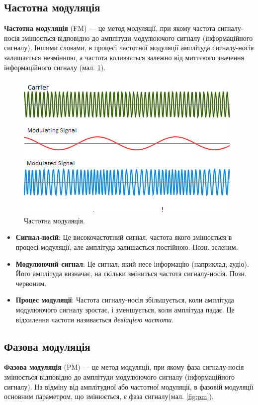 \documentclass{article}
\begin{document}
\subsection{Частотна модуляція}

\textbf{Частотна модуляція} (FM) --- це метод модуляції, при якому частота сигналу-носія змінюється відповідно до амплітуди модулюючого сигналу (інформаційного сигналу). Іншими словами, в процесі частотної модуляції амплітуда сигналу-носія залишається незмінною, а частота коливається залежно від миттєвого значення інформаційного сигналу (мал. \ref{fig:fm}).

\begin{figure}[h!]
\centering
\includegraphics[width=0.6\linewidth]{images/fm.png}
\caption{\label{fig:fm}Частотна модуляція.}
\end{figure}

\begin{itemize}[noitemsep, topsep=8pt]
\item \textbf{Сигнал-носій}: Це високочастотний сигнал, частота якого змінюється в процесі модуляції, але амплітуда залишається постійною. Позн. зеленим.
\item \textbf{Модулюючий сигнал}: Це сигнал, який несе інформацію (наприклад, аудіо). Його амплітуда визначає, на скільки зміниться частота сигналу-носія. Позн. червоним.
\item \textbf{Процес модуляції}: Частота сигналу-носія збільшується, коли амплітуда модулюючого сигналу зростає, і зменшується, коли амплітуда падає. Це відхилення частоти називається \textit{девіацією частоти}.
\end{itemize}

\subsection{Фазова модуляція}

\textbf{Фазова модуляція} (PM) --- це метод модуляції, при якому фаза сигналу-носія змінюється відповідно до амплітуди модулюючого сигналу (інформаційного сигналу). На відміну від амплітудної або частотної модуляції, в фазовій модуляції основним параметром, що змінюється, є фаза сигналу(мал. \ref{fig:pm}).
\end{document}
